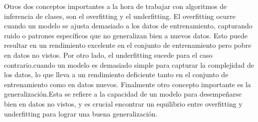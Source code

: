 Otros dos conceptos importantes a la hora de trabajar con algoritmos de inferencia de clases, son el overfitting y el underfitting. El overfitting ocurre cuando un modelo se ajusta demasiado a los datos de entrenamiento, capturando ruido o patrones específicos que no generalizan bien a nuevos datos. Esto puede resultar en un rendimiento excelente en el conjunto de entrenamiento pero pobre en datos no vistos.
Por otro lado, el underfitting sucede para el caso contrario.cuando un modelo es demasiado simple para capturar la complejidad de los datos, lo que lleva a un rendimiento deficiente tanto en el conjunto de entrenamiento como en datos nuevos.
Finalmente otro concepto importante es la generalización.Esta se refiere a la capacidad de un modelo para desempeñarse bien en datos no vistos, y es crucial encontrar un equilibrio entre overfitting y underfitting para lograr una buena generalización.